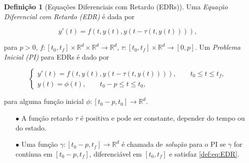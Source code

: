 \documentclass{beamer}
\newcommand{\R}{\mathbb{R}}
\theoremstyle{plain}
\theoremstyle{definition}
\newtheorem{defi}{Definição}
\begin{document}
\begin{frame}
        \footnotesize
    \begin{defi}[Equações Diferenciais com Retardo (EDRs)]

        Uma \textit{Equação Diferencial com Retardo (EDR)} é dada por

        \begin{equation}
            y'(t) = f(t, y(t), y(t - \tau(t, y(t)))),
        \end{equation}

        para $p > 0$, $f:[t_0, t_f] \times \R^d \times \R^d \to \R^d$, $\tau: [t_0, t_f] \times \R^d \to [0, p]$. Um \textit{Problema Inicial (PI)} para EDRs é dado por

        \begin{equation}  
            \begin{cases}
                y'(t) = f(t, y(t), y(t - \tau(t, y(t)))), \qquad t_0 \leq t \leq t_f , \\
                y(t) = \phi(t), \qquad t_0 - p \leq t \leq t_0, 
            \end{cases}
            \label{def:eq:EDR}
        \end{equation}

        para alguma função inicial $\phi:[t_0 - p, t_0] \to \R^d$.


        \begin{itemize}
            \item[$\bullet$] A função retardo $\tau$ é positiva e pode ser constante, depender do tempo ou do estado.
            \item[$\bullet$] Uma função $\gamma:[t_0 - p, t_f] \to \R^d$ é chamada de \textit{solução} para o PI se $\gamma$ for contínua em $[t_0 - p, t_f]$, diferenciável em $[t_0, t_f]$ e satisfaz \eqref{def:eq:EDR}.

        \end{itemize}
    \end{defi}


\end{frame}

\end{document}
